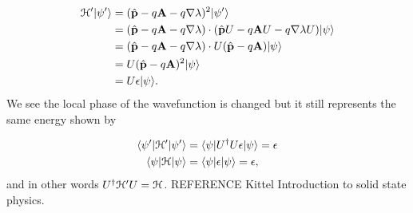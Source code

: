 \begin{align}
  \ham' |\psi'\rangle &= (\hat{p} - q \vec{A} - q \nabla \lambda)^2 |\psi'\rangle \nonumber \\
  &= (\hat{p} - q \vec{A} - q \nabla \lambda) \cdot (\hat{p} U - q \vec{A} U - q \nabla \lambda U) |\psi\rangle \nonumber \\
  &= (\hat{p} - q \vec{A} - q \nabla \lambda) \cdot U (\hat{p} - q \vec{A}) |\psi\rangle \nonumber \\
  &= U (\hat{p} - q \vec{A})^2 |\psi\rangle \nonumber \\
  &= U \epsilon |\psi\rangle.
\end{align}
We see the local phase of the wavefunction is changed but it still represents the same energy shown by

\begin{align}
  \langle \psi'| \mathcal{H}' |\psi'\rangle &= \langle \psi | U^{\dagger} U \epsilon |\psi \rangle = \epsilon \nonumber \\
  \langle \psi | \mathcal{H} |\psi \rangle &= \langle \psi | \epsilon |\psi \rangle = \epsilon,
\end{align}
and in other words $U^{\dagger} \mathcal{H}' U = \mathcal{H}$.
REFERENCE Kittel Introduction to solid state physics.
